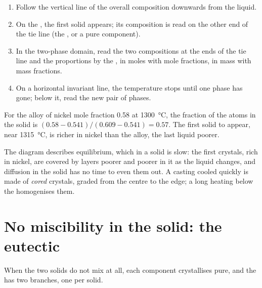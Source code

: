 \begin{method}\label{met:b2:solid-liquid-diagrams:read-solid-liquid}
\begin{enumerate}
  \item Follow the vertical line of the overall composition downwards from the
        liquid.
  \item On the , the first solid appears; its composition is read on
        the other end of the tie line (the , or a pure component).
  \item In the two-phase domain, read the two compositions at the ends of the
        tie line and the proportions by the , in moles with mole
        fractions, in mass with mass fractions.
  \item On a horizontal invariant line, the temperature stops until one phase
        has gone; below it, read the new pair of phases.
\end{enumerate}
\end{method}

\begin{example}\label{ex:b2:solid-liquid-diagrams:lever}
For the alloy of nickel mole fraction 0.58 at \qty{1300}{\degreeCelsius}, the
fraction of the atoms in the solid is $(0.58 - 0.541)/(0.609 - 0.541) = 0.57$.
The first solid to appear, near \qty{1315}{\degreeCelsius}, is richer in nickel
than the alloy, the last liquid poorer.
\end{example}

The diagram describes equilibrium, which in a solid is slow: the first crystals,
rich in nickel, are covered by layers poorer and poorer in it as the liquid
changes, and diffusion in the solid has no time to even them out. A casting
cooled quickly is made of \textit{cored} crystals, graded from the centre to the
edge; a long heating below the  homogenises them.

\section{No miscibility in the solid: the eutectic}

When the two solids do not mix at all, each component crystallises pure, and
the  has two branches, one per solid.

